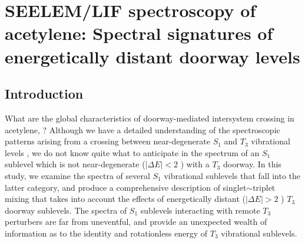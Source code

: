 % 







\chapter{SEELEM/LIF spectroscopy of acetylene: Spectral signatures of
  energetically distant doorway levels}

\section{Introduction}

What are the global characteristics of doorway-mediated intersystem
crossing in acetylene, ?  Although we have a detailed
understanding of the spectroscopic patterns arising from a crossing
between near-degenerate $S_1$ and $T_3$ vibrational levels
\cite{humphrey97, altunata00, altunata01, mishra04}, we do not know
quite what to anticipate in the spectrum of an $S_1$ sublevel which is
not near-degenerate ($\lvert \Delta E \rvert < 2$ \rcm) with a $T_3$
doorway.  In this study, we examine the spectra of several $S_1$
vibrational sublevels that fall into the latter category, and produce
a comprehensive description of singlet$\sim$triplet mixing that takes into
account the effects of energetically distant ($\lvert \Delta E \rvert
> 2$ \rcm) $T_3$ doorway sublevels.  The spectra of $S_1$ sublevels
interacting with remote $T_3$ perturbers are far from uneventful, and
provide an unexpected wealth of information as to the identity and
rotationless energy of $T_3$ vibrational sublevels.

